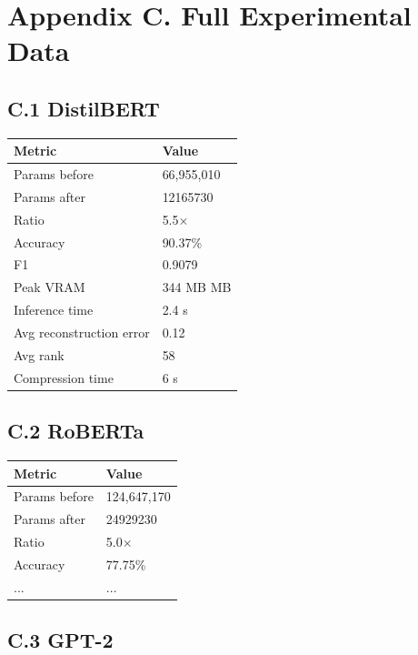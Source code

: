 
\section{Appendix C. Full Experimental Data}

\subsection{C.1 DistilBERT}

\begin{table}[H]
\centering
\small
\begin{tabular}{ll}
\toprule
\textbf{Metric} & \textbf{Value} \\
\midrule
Params before & 66,955,010 \\
Params after & 12165730 \\
Ratio & 5.5$\times$ \\
Accuracy & 90.37\% \\
F1 & 0.9079 \\
Peak VRAM & 344 MB MB \\
Inference time & 2.4 s \\
Avg reconstruction error & 0.12 \\
Avg rank & 58 \\
Compression time & 6 s \\
\bottomrule
\end{tabular}
\end{table}

\subsection{C.2 RoBERTa}

\begin{table}[H]
\centering
\small
\begin{tabular}{ll}
\toprule
\textbf{Metric} & \textbf{Value} \\
\midrule
Params before & 124,647,170 \\
Params after & 24929230 \\
Ratio & 5.0$\times$ \\
Accuracy & 77.75\% \\
... & ... \\
\bottomrule
\end{tabular}
\end{table}

\subsection{C.3 GPT-2}

